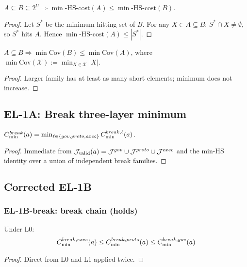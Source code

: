 \begin{lemma}
$A\subseteq B\subseteq 2^U\Rightarrow\min\text{-HS-cost}(A)\le\min\text{-HS-cost}(B)$.
\end{lemma}
\begin{proof}
Let $S^*$ be the minimum hitting set of $B$.
For any $X\in A\subseteq B$: $S^*\cap X\ne\emptyset$,
so $S^*$ hits $A$. Hence $\min\text{-HS-cost}(A)\le|S^*|$.
\end{proof}

\begin{lemma}
$A\subseteq B\Rightarrow\min\mathrm{Cov}(B)\le\min\mathrm{Cov}(A)$,
where $\min\mathrm{Cov}(\mathcal{X}):=\min_{X\in\mathcal{X}}|X|$.
\end{lemma}
\begin{proof}
Larger family has at least as many short elements; minimum does not increase.
\end{proof}

\subsection{EL-1A: Break three-layer minimum}

\begin{theorem}[EL-1A]\label{thm:el1a}
$C_{\min}^{break}(a)=\min_{\ell\in\{gov,proto,exec\}}C_{\min}^{break,\ell}(a)$.
\end{theorem}
\begin{proof}
Immediate from $\mathcal{J}_{\mathrm{valid}}(a)=\mathcal{J}^{gov}\cup\mathcal{J}^{proto}\cup\mathcal{J}^{exec}$
and the min-HS identity over a union of independent break families.
\end{proof}

\subsection{Corrected EL-1B}\label{sec:el1b-correct}

\subsubsection*{EL-1B-break: break chain (holds)}

\begin{theorem}[EL-1B-break]\label{thm:el1b-break}
Under L0:
$$C_{\min}^{break,exec}(a)\le C_{\min}^{break,proto}(a)\le C_{\min}^{break,gov}(a)$$
\end{theorem}
\begin{proof}
Direct from L0 and L1 applied twice.
\end{proof}

